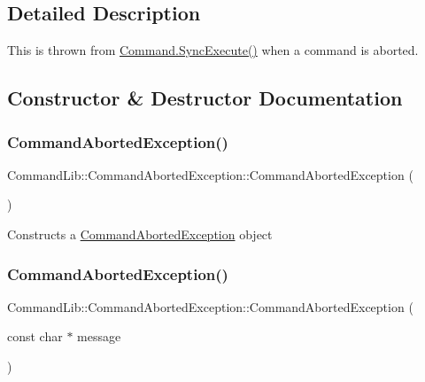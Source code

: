 \subsection{Detailed Description}
This is thrown from \mbox{\hyperlink{class_command_lib_1_1_command_a5d33760ccb927d7f6349c02907ab4ff3}{Command.\+Sync\+Execute()}} when a command is aborted. 



\subsection{Constructor \& Destructor Documentation}
\mbox{\label{class_command_lib_1_1_command_aborted_exception_af5a16bb24375fcba3b2f5c0523d50902}} 
\subsubsection{\texorpdfstring{Command\+Aborted\+Exception()}{CommandAbortedException()}\hspace{0.1cm}{\footnotesize\ttfamily [1/3]}}
{\footnotesize\ttfamily Command\+Lib\+::\+Command\+Aborted\+Exception\+::\+Command\+Aborted\+Exception (\begin{DoxyParamCaption}{ }\end{DoxyParamCaption})}



Constructs a \mbox{\hyperlink{class_command_lib_1_1_command_aborted_exception}{Command\+Aborted\+Exception}} object 

\mbox{\label{class_command_lib_1_1_command_aborted_exception_ab599bf3faa5161b7c82aa490b0dd6ce3}} 
\subsubsection{\texorpdfstring{Command\+Aborted\+Exception()}{CommandAbortedException()}\hspace{0.1cm}{\footnotesize\ttfamily [2/3]}}
{\footnotesize\ttfamily Command\+Lib\+::\+Command\+Aborted\+Exception\+::\+Command\+Aborted\+Exception (\begin{DoxyParamCaption}\item[{const char $\ast$}]{message }\end{DoxyParamCaption})\hspace{0.3cm}{\ttfamily [explicit]}}



